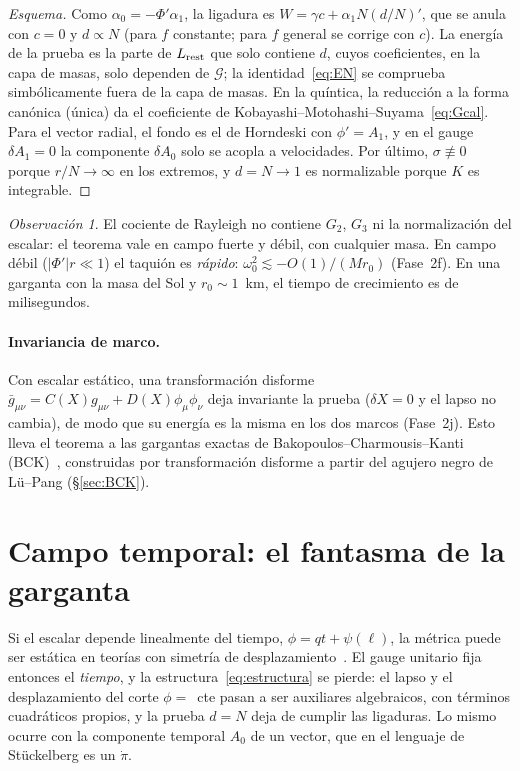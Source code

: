 \documentclass[11pt,a4paper]{article}
\theoremstyle{remark}
\newtheorem{nota}{Observación}
\newcommand{\G}{\mathcal G}
\begin{document}
\begin{proof}[Esquema]
Como $\alpha_0=-\Phi'\alpha_1$, la ligadura es $W=\gamma c+\alpha_1N(d/N)'$, que se anula con $c=0$ y $d\propto N$ (para $f$ constante; para $f$ general se corrige con $c$). La energía de la prueba es la parte de $L_{\rm rest}$ que solo contiene $d$, cuyos coeficientes, en la capa de masas, solo dependen de $\G$; la identidad~\eqref{eq:EN} se comprueba simbólicamente fuera de la capa de masas. En la quíntica, la reducción a la forma canónica (única) da el coeficiente de Kobayashi--Motohashi--Suyama~\eqref{eq:Gcal}. Para el vector radial, el fondo es el de Horndeski con $\phi'=A_1$, y en el gauge $\delta A_1=0$ la componente $\delta A_0$ solo se acopla a velocidades. Por último, $\sigma\not\equiv0$ porque $r/N\to\infty$ en los extremos, y $d=N\to1$ es normalizable porque $K$ es integrable.
\end{proof}

\begin{nota}
El cociente de Rayleigh no contiene $G_2$, $G_3$ ni la normalización del escalar: el teorema vale en campo fuerte y débil, con cualquier masa. En campo débil ($|\Phi'|r\ll1$) el taquión es \emph{rápido}: $\omega_0^2\lesssim-O(1)/(Mr_0)$ (Fase~2f). En una garganta con la masa del Sol y $r_0\sim1$~km, el tiempo de crecimiento es de milisegundos.
\end{nota}

\paragraph{Invariancia de marco.} Con escalar estático, una transformación disforme $\bar g_{\mu\nu}=C(X)g_{\mu\nu}+D(X)\phi_\mu\phi_\nu$ deja invariante la prueba ($\delta X=0$ y el lapso no cambia), de modo que su energía es la misma en los dos marcos (Fase~2j). Esto lleva el teorema a las gargantas exactas de Bakopoulos--Charmousis--Kanti (BCK)~\cite{BCK}, construidas por transformación disforme a partir del agujero negro de Lü--Pang (\S\ref{sec:BCK}).

\section{Campo temporal: el fantasma de la garganta}\label{sec:temporal}

Si el escalar depende linealmente del tiempo, $\phi=qt+\psi(\ell)$, la métrica puede ser estática en teorías con simetría de desplazamiento~\cite{BabichevCharmousis}. El gauge unitario fija entonces el \emph{tiempo}, y la estructura~\eqref{eq:estructura} se pierde: el lapso y el desplazamiento del corte $\phi=$~cte pasan a ser auxiliares algebraicos, con términos cuadráticos propios, y la prueba $d=N$ deja de cumplir las ligaduras. Lo mismo ocurre con la componente temporal $A_0$ de un vector, que en el lenguaje de Stückelberg es un $\dot\pi$.
\end{document}
